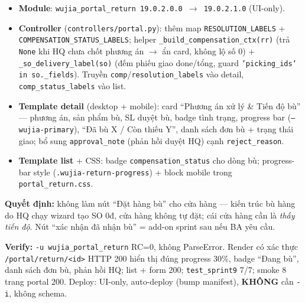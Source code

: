 \begin{itemize}
  \item \textbf{Module}: \texttt{wujia\_portal\_return 19.0.2.0.0 $\to$ 19.0.2.1.0} (UI-only).
  \item \textbf{Controller} (\texttt{controllers/portal.py}): thêm map \texttt{RESOLUTION\_LABELS} +
    \texttt{COMPENSATION\_STATUS\_LABELS}; helper \texttt{\_build\_compensation\_ctx(rr)} (trả \texttt{None}
    khi HQ chưa chốt phương án $\to$ ẩn card, không lộ số 0) + \texttt{\_so\_delivery\_label(so)} (đếm
    phiếu giao done/tổng, guard \texttt{'picking\_ids' in so.\_fields}). Truyền \texttt{comp}/\texttt{resolution\_labels}
    vào detail, \texttt{comp\_status\_labels} vào list.
  \item \textbf{Template detail} (desktop + mobile): card ``Phương án xử lý \& Tiến độ bù'' ---
    phương án, sản phẩm bù, SL duyệt bù, badge tình trạng, progress bar (\texttt{--wujia-primary}),
    ``Đã bù X / Còn thiếu Y'', danh sách đơn bù + trạng thái giao; bổ sung \texttt{approval\_note}
    (phản hồi duyệt HQ) cạnh \texttt{reject\_reason}.
  \item \textbf{Template list} + CSS: badge \texttt{compensation\_status} cho dòng bù; progress-bar
    style (\texttt{.wujia-return-progress}) + block mobile trong \texttt{portal\_return.css}.
\end{itemize}

\textbf{Quyết định:} không làm nút ``Đặt hàng bù'' cho cửa hàng --- kiến trúc bù hàng do HQ chạy wizard
tạo SO 0đ, cửa hàng không tự đặt; cái cửa hàng cần là \emph{thấy tiến độ}. Nút ``xác nhận đã nhận bù''
= add-on sprint sau nếu BA yêu cầu.

\textbf{Verify:} \texttt{-u wujia\_portal\_return} RC=0, không ParseError. Render có xác thực
\texttt{/portal/return/<id>} HTTP 200 hiển thị đúng progress 30\%, badge ``Đang bù'', danh sách đơn bù,
phản hồi HQ; list + form 200; \texttt{test\_sprint9} 7/7; smoke 8 trang portal 200. Deploy: UI-only,
auto-deploy (bump manifest), \textbf{KHÔNG} cần \texttt{-i}, không schema.
